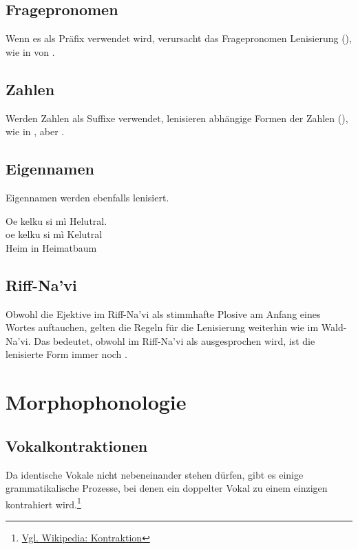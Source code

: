 \subsection{Fragepronomen} Wenn es als Präfix verwendet wird, verursacht das Fragepronomen  Lenisierung (), wie in   von  .

\subsection{Zahlen}
Werden Zahlen als Suffixe verwendet, lenisieren abhängige Formen der Zahlen (), wie in  , aber  .

\subsection{Eigennamen} Eigennamen werden ebenfalls lenisiert.

\begin{interlin} \label{lenition:ex01}
	\glll Oe kelku si mì Helutral. \\
	oe kelku si mì Kelutral \\
	 Heim  in Heimatbaum \\
\end{interlin}


\subsection{Riff-Na'vi} 
Obwohl die Ejektive im Riff-Na'vi als stimmhafte Plosive am Anfang eines Wortes auftauchen, gelten die Regeln für die Lenisierung weiterhin wie im Wald-Na'vi. Das bedeutet, obwohl   im Riff-Na'vi als  ausgesprochen wird, ist die lenisierte Form immer noch .

\section{Morphophonologie}

\subsection{Vokalkontraktionen} Da identische Vokale nicht nebeneinander stehen dürfen, gibt es einige grammatikalische Prozesse, bei denen ein doppelter Vokal zu einem einzigen kontrahiert wird.\footnote{\href{https://de.wikipedia.org/wiki/Kontraktion_(Linguistik)}{Vgl. Wikipedia: Kontraktion}}\label{lands:contract}

